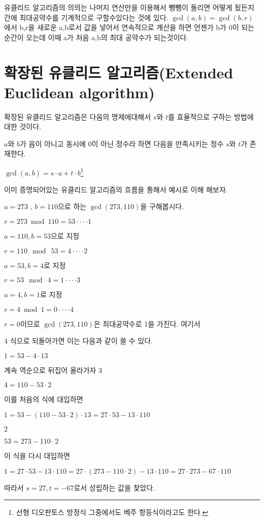 \documentclass{oblivoir}
\begin{document}
\vspace{1\baselineskip}

유클리드 알고리즘의 의의는 나머지 연산만을 이용해서 뺑뺑이 돌리면 어떻게 됬든지 간에 최대공약수를 기계적으로 구할수있다는 것에 있다. $\gcd(a,b) = \gcd(b,r)$에서 b,r을 새로운 a,b로서 값을 넣어서 연속적으로 계산을 하면 언젠가 b가 0이 되는 순간이 오는데 이때 a가 처음 a,b의 최대 공약수가 되는것이다.
\newpage

\section{확장된 유클리드 알고리즘(Extended Euclidean algorithm)} 
확장된 유클리드 알고리즘은 다음의 명제에대해서 $s$와 $t$를 효율적으로 구하는 방법에대한 것이다. 
\begin{justbox}
$a$와 $b$가 음이 아니고 동시에 0이 아닌 정수라 하면 다음을 만족시키는 정수 $s$와 $t$가 존재한다.
\begin{center}
    $\gcd(a,b) = s\cdot a + t\cdot b$\footnote{선형 디오판토스 방정식 그중에서도 베주 항등식이라고도 한다.}
\end{center}
\end{justbox}
이미 증명되어있는 유클리드 알고리즘의 흐름을 통해서 예시로 이해 해보자.\par
$a=273$  , $b=110$으로 하는 $\gcd(273,110)$을 구해봅시다.
\begin{center}
    $r= 273\bmod  110 = 53 \cdot\cdot\cdot\cdot \mathit{1}$
\end{center}
$a=110 , b=53$으로 지정
\begin{center}
    $r= 110\:\bmod \: 53 = 4\cdot\cdot\cdot\cdot \mathit{2}$
\end{center}
$a=53 , b=4$로 지정
\begin{center}
    $r= 53\:\bmod \: 4 = 1 \cdot\cdot\cdot\cdot \mathit{3}$
\end{center}
$a=4 , b=1$로 지정
\begin{center}
    $r= 4\bmod  1 = 0\cdot\cdot\cdot\cdot \mathit{4}$
\end{center}
$r=0$이므로 $\gcd(273,110)$은 최대공약수로 1을 가진다.
여기서 

$\mathit{4}$ 식으로 되돌아가면 이는 다음과 같이 쓸 수 있다.
\begin{center}
    $1=53 - 4\cdot13$
\end{center}
계속 역순으로 뒤집어 올라가자 $\mathit{3}$
\begin{center}
    $4=110 - 53\cdot2$
\end{center}
이를 처음의 식에 대입하면
\begin{center}
    $1=53 - (110 - 53\cdot2)\cdot13 =27\cdot53-13\cdot110 $
\end{center}
$\mathit{2}$
\begin{center}
    $53=273 - 110\cdot2$
\end{center}
이 식을 다시 대입하면
\begin{center}
    $1=27\cdot53-13\cdot110=27\cdot(273 - 110\cdot2)-13\cdot110=27\cdot273-67\cdot 110$
\end{center}
따라서 $s=27, t=-67$로서 성립하는 값을 찾았다.
\end{document}

